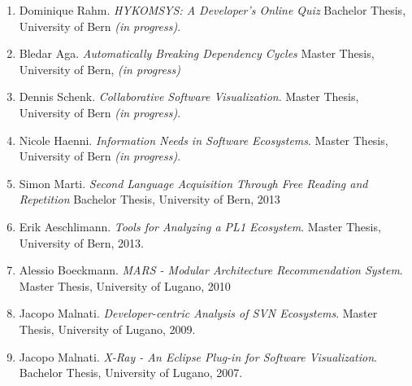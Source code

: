 
\begin{enumerate}

\item Dominique Rahm. \emph{HYKOMSYS: A Developer's Online Quiz} Bachelor Thesis, University of Bern \emph{(in progress)}.

\item Bledar Aga. \emph{Automatically Breaking Dependency Cycles} Master Thesis, University of Bern, \emph{(in progress)}

\item Dennis Schenk. \emph{Collaborative Software Visualization}. Master Thesis, University of Bern \emph{(in progress)}.

\item Nicole Haenni. \emph {Information Needs in Software Ecosystems}. Master Thesis, University of Bern \emph{(in progress)}.

\item Simon Marti. \emph{Second Language Acquisition Through Free Reading and Repetition} Bachelor Thesis, University of Bern, 2013

\item Erik Aeschlimann. \emph {Tools for Analyzing a PL1 Ecosystem}. Master Thesis, University of Bern, 2013.

\item Alessio Boeckmann. \emph{MARS - Modular Architecture Recommendation System}. Master Thesis, University of Lugano, 2010

\item Jacopo Malnati. \emph{Developer-centric Analysis of SVN Ecosystems}. Master Thesis, University of Lugano, 2009.

\item Jacopo Malnati. \emph{X-Ray - An Eclipse Plug-in for Software Visualization}. Bachelor Thesis, University of Lugano, 2007.

\end{enumerate}